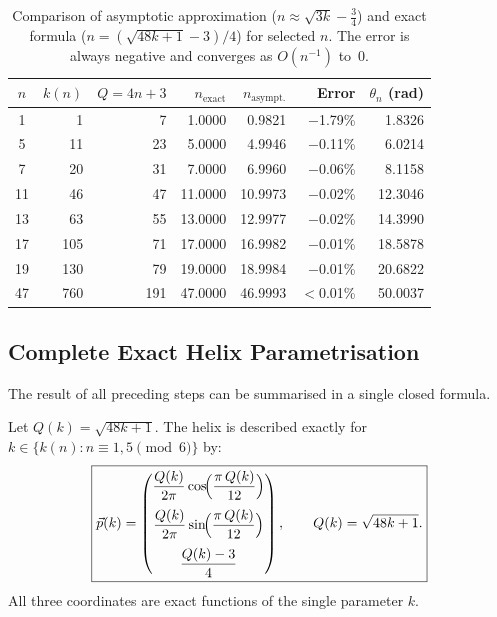 \begin{table}[H]
\centering
\renewcommand{\arraystretch}{1.25}
\caption{Comparison of asymptotic approximation ($n \approx \sqrt{3k}-\tfrac{3}{4}$)
  and exact formula ($n = (\sqrt{48k+1}-3)/4$) for selected $n$.
  The error is always negative and converges as $O(n^{-1})$ to~$0$.}
\begin{tabular}{crrrrrr}
\toprule
$n$ & $k(n)$ & $Q = 4n+3$ & $n_{\mathrm{exact}}$ &
  $n_{\mathrm{asympt.}}$ & Error & $\theta_n$ (rad) \\
\midrule
 1 &   1 &   7 &  1.0000 &  0.9821 & $-$1.79\% &  1.8326 \\
 5 &  11 &  23 &  5.0000 &  4.9946 & $-$0.11\% &  6.0214 \\
 7 &  20 &  31 &  7.0000 &  6.9960 & $-$0.06\% &  8.1158 \\
11 &  46 &  47 & 11.0000 & 10.9973 & $-$0.02\% & 12.3046 \\
13 &  63 &  55 & 13.0000 & 12.9977 & $-$0.02\% & 14.3990 \\
17 & 105 &  71 & 17.0000 & 16.9982 & $-$0.01\% & 18.5878 \\
19 & 130 &  79 & 19.0000 & 18.9984 & $-$0.01\% & 20.6822 \\
47 & 760 & 191 & 47.0000 & 46.9993 & $<$0.01\% & 50.0037 \\
\bottomrule
\end{tabular}
\label{tab:helix_numerisch}
\end{table}

\subsection{Complete Exact Helix Parametrisation}
\label{subsec:helix_parametrisierung}

The result of all preceding steps can be summarised in a single
closed formula.

\begin{satz}\label{satz:helix}
Let $Q(k) = \sqrt{48k+1}$. The helix is described exactly for
$k \in \{k(n) : n \equiv 1,5 \pmod{6}\}$ by:
\begin{equation}\label{eq:helix_exakt}
  \boxed{
  \vec{p}(k)
  = \begin{pmatrix}
      \dfrac{Q(k)}{2\pi}\cos\!\Bigl(\dfrac{\pi\,Q(k)}{12}\Bigr)\\[10pt]
      \dfrac{Q(k)}{2\pi}\sin\!\Bigl(\dfrac{\pi\,Q(k)}{12}\Bigr)\\[10pt]
      \dfrac{Q(k)-3}{4}
    \end{pmatrix},
  \qquad Q(k) = \sqrt{48k+1}.
  }
\end{equation}
All three coordinates are exact functions of the single parameter $k$.
\end{satz}

